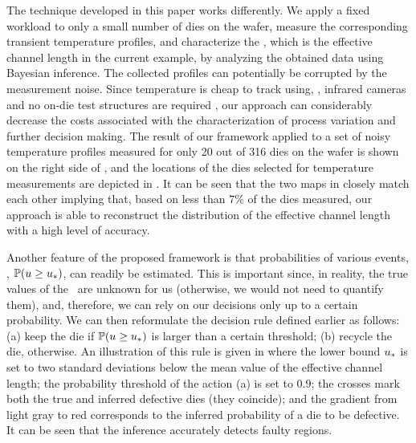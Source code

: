 The technique developed in this paper works differently. We apply a fixed workload to only a small number of dies on the wafer, measure the corresponding transient temperature profiles, and characterize the \qoi, which is the effective channel length in the current example, by analyzing the obtained data using Bayesian inference.
The collected profiles can potentially be corrupted by the measurement noise. Since temperature is cheap to track using, \eg, infrared cameras and no on-die test structures are required \cite{mesa-martinez2007}, our approach can considerably decrease the costs associated with the characterization of process variation and further decision making.
The result of our framework applied to a set of noisy temperature profiles measured for only 20 out of 316 dies on the wafer is shown on the right side of , and the locations of the dies selected for temperature measurements are depicted in .
It can be seen that the two maps in  closely match each other implying that, based on less than $7\%$ of the dies measured, our approach is able to reconstruct the distribution of the effective channel length with a high level of accuracy.

Another feature of the proposed framework is that probabilities of various events, \eg, $\mathbb{P}(u \geq u_*)$, can readily be estimated.
This is important since, in reality, the true values of the \qoi\ are unknown for us (otherwise, we would not need to quantify them), and, therefore, we can rely on our decisions only up to a certain probability.
We can then reformulate the decision rule defined earlier as follows: (a) keep the die if $\mathbb{P}(u \geq u_*)$ is larger than a certain threshold; (b) recycle the die, otherwise.
An illustration of this rule is given in  where the lower bound $u_*$ is set to two standard deviations below the mean value of the effective channel length; the probability threshold of the action (a) is set to 0.9; the crosses mark both the true and inferred defective dies (they coincide); and the gradient from light gray to red corresponds to the inferred probability of a die to be defective. It can be seen that the inference accurately detects faulty regions.



